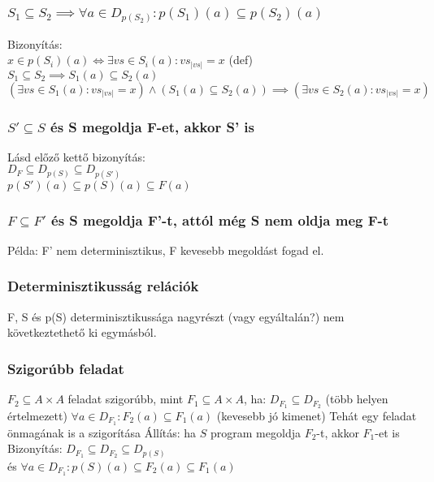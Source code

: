 \documentclass[12pt,a4paper]{article}
\begin{document}
\subsubsection{$S_1 \subseteq S_2 \implies \forall a \in D_{p(S_2)}: p(S_1)(a) \subseteq p(S_2)(a)$}

Bizonyítás: \\
$x \in p(S_i)(a) \Leftrightarrow \exists vs \in S_i(a): vs_{|vs|}=x$ (def) \\
$S_1 \subseteq S_2 \implies S_1(a) \subseteq S_2(a)$ \\
$(\exists vs \in S_1(a): vs_{|vs|}=x) \wedge (S_1(a) \subseteq S_2(a))
\implies (\exists vs \in S_2(a): vs_{|vs|}=x)$

\subsubsection{$S' \subseteq S$ és S megoldja F-et, akkor S' is}

Lásd előző kettő bizonyítás: \\
$D_F \subseteq D_{p(S)} \subseteq D_{p(S')}$ \\
$p(S')(a) \subseteq p(S)(a) \subseteq F(a)$

\subsubsection{$F \subseteq F'$ és S megoldja F'-t, attól még S nem oldja meg F-t}

Példa: F' nem determinisztikus, F kevesebb megoldást fogad el.

\subsubsection{Determinisztikusság relációk}

F, S és p(S) determinisztikussága nagyrészt (vagy egyáltalán?) nem következtethető ki egymásból.

\subsubsection{Szigorúbb feladat}

\begin{outline}
	\1 $F_2 \subseteq A \times A$ feladat szigorúbb, mint $F_1 \subseteq A \times A$, ha:
		\2 $D_{F_1} \subseteq D_{F_2}$ \;\;(több helyen értelmezett)
		\2 $\forall a \in D_{F_1}: F_2(a) \subseteq F_1(a)$ \;\;(kevesebb jó kimenet)
		\2 Tehát egy feladat önmagának is a szigorítása
	\1 Állítás: ha $S$ program megoldja $F_2$-t, akkor $F_1$-et is
	\1 Bizonyítás: $D_{F_1} \subseteq D_{F_2} \subseteq D_{p(S)}$\\
	és $\forall a \in D_{F_1}: p(S)(a) \subseteq F_2(a) \subseteq F_1(a)$
\end{outline}
\end{document}
